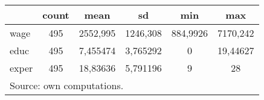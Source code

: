 {
\def\sym#1{\ifmmode^{#1}\else\(^{#1}\)\fi}
\begin{tabular}{l*{1}{ccccc}}
\hline\hline
                    &       count&        mean&          sd&         min&         max\\
\hline
wage                &         495&    2552,995&    1246,308&    884,9926&    7170,242\\
educ                &         495&    7,455474&    3,765292&           0&    19,44627\\
exper               &         495&    18,83636&    5,791196&           9&          28\\
\hline\hline
\multicolumn{6}{l}{\footnotesize Source: own computations.}\\
\end{tabular}
}
